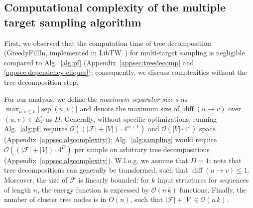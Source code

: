 \documentclass{bioinfo}
\newcommand{\separator}[2]{\operatorname{sep}(#1,#2)}
\newcommand{\difference}[2]{\operatorname{diff}(#1 \rightarrow #2)}
\newcommand{\F}{\mathcal{F}}
\newcommand{\edgesToR}{E^r_T}
\newcommand{\Software}[1]{{\ttfamily #1}}
\begin{document}
\subsection{Computational complexity of the multiple target sampling algorithm}\label{sec:complexity}


First, we observed that the computation time of tree decomposition
(\Software{GreedyFillIn}, implemented in \Software{LibTW}~\cite{Dijk2006}) for multi-target
sampling is negligible compared to Alg.~\ref{alg:pf} (Appendix~\ref{appsec:treedecomp} and \ref{appsec:dependency-cliques});
consequently, we discuss complexities without the tree decomposition
step.

For our analysis, we define the \emph{maximum separator size} $s$ as
$\max_{u,v\in V} | \separator{u}{v} |$ and denote the maximum size of
$\difference{u}{v}$ over $(u,v)\in\edgesToR{}$ as $D$.  Generally,
without specific optimizations, running Alg.~\ref{alg:pf} requires
$\mathcal{O}((|\F|+|V|)\cdot 4^{w+1})$ and $\mathcal{O}(|V|\cdot4^s)$ space (Appendix~\ref{appsec:algcomplexity});
Alg.~\ref{alg:sampling} would require $\mathcal{O}((|\F|+|V|)\cdot 4^D)$ per
sample on arbitrary tree decompositions (Appendix~\ref{appsec:algcomplexity}). W.l.o.g. we assume that
$D=1$; note that tree decompositions can generally be transformed,
such that $\difference{u}{v}\leq 1$.
%
Moreover, the size of $\F$ is linearly bounded: for $k$
input structures for sequences of length $n$, the energy function is
expressed by $\mathcal{O}(n\,k)$ functions. Finally, the number of cluster
tree nodes is in $O(n)$, such that $|\F|+|V| \in \mathcal{O}(n\,k)$.
\end{document}
